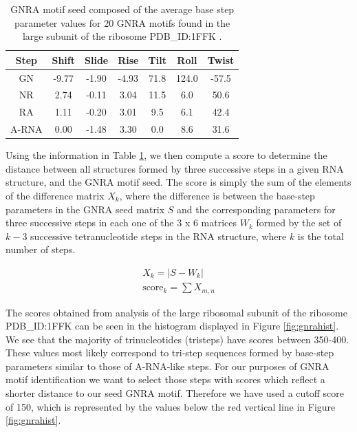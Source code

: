 \begin{table}[hb]  
\begin{center}
\begin{tabular}{|c|c|c|c|c|c|c|}
\hline
Step & Shift & Slide & Rise & Tilt & Roll & Twist \\
\hline
GN & -9.77 & -1.90 & -4.93 & 71.8 & 124.0 & -57.5 \\
NR & 2.74 & -0.11 & 3.04 & 11.5 & 6.0 & 50.6 \\
RA & 1.11 & -0.20 & 3.01 & 9.5 & 6.1 & 42.4 \\
A-RNA & 0.00 & -1.48 & 3.30 & 0.0 & 8.6 & 31.6\\
\hline
\end{tabular}
\caption{GNRA motif  seed composed of the average  base step parameter
  values for 20 GNRA motifs found in the large subunit of the ribosome
  PDB\_ID:1FFK \cite{lemieux2006}.}
\label{tab:seed}
\end{center}
\end{table}

Using the information in Table \ref{tab:seed}, we then compute a score
to  determine the  distance  between all  structures  formed by  three
successive  steps  in  a  given  RNA structure,  and  the  GNRA  motif
seed. The  score is simply the  sum of the elements  of the difference
matrix  $X_{k}$,  where  the   difference  is  between  the  base-step
parameters  in  the  GNRA   seed  matrix  $S$  and  the  corresponding
parameters  for three  successive  steps in  each  one of  the  3 x  6
matrices $W_{k}$ formed by the set of $k-3$ successive tetranucleotide
steps in the RNA structure, where  $k$ is the total number of steps.

\begin{gather}
X_{k} = |S - W_{k}| \\
\text{score}_{k} = \sum X_{m,n} 
\label{eq:sumdiffscore}
\end{gather}  

The scores  obtained from analysis  of the large ribosomal  subunit of
the ribosome  PDB\_ID:1FFK can be  seen in the histogram  displayed in
Figure \ref{fig:gnrahist}. We see  that the majority of trinucleotides
(tristeps)  have scores  between  350-400.  These  values most  likely
correspond  to  tri-step  sequences  formed  by  base-step  parameters
similar to those of A-RNA-like  steps.  For our purposes of GNRA motif
identification we want to select those steps with scores which reflect
a shorter distance  to our seed GNRA motif.  Therefore  we have used a
cutoff score of 150, which is  represented by the values below the red
vertical line in Figure \ref{fig:gnrahist}.

